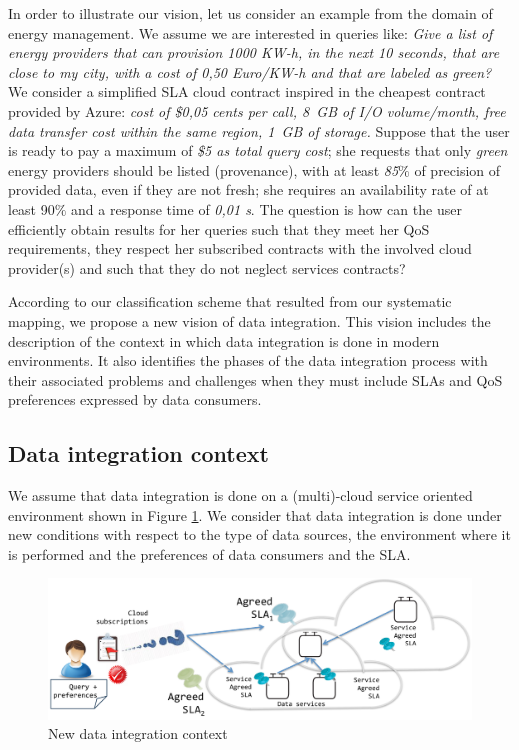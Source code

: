 
In order to illustrate our vision, let us consider an example from the domain of energy
management. We assume we are interested in queries like: \textit{Give a list
of energy providers that can provision 1000 KW-h, in the next 10 seconds, that are close to my city, with a cost of 0,50 Euro/KW-h and that are labeled as green?} We consider a simplified SLA cloud contract inspired in the cheapest contract provided by Azure: \textit{cost of \$0,05 cents per call,  8~GB of I/O volume/month, free data transfer cost within the same region,  1~GB of storage.} 
Suppose that the user is ready to pay a maximum of \textit{\$5 as total query cost}; she requests that only  \textit{green} energy providers should be  listed (provenance), with at least  \textit{85$\%$} of precision of provided data, even if they are not fresh; she requires an availability rate of at least 90$\%$ and a response time of  \textit{0,01 s}. 
  The question is how can the user efficiently obtain  results for her queries such that they meet her QoS requirements, they respect her subscribed contracts with the involved cloud provider(s) and such that they do not neglect services contracts? 

According to our classification scheme that resulted from our systematic mapping, we propose a new vision of data integration. This vision includes the description of the context in which data integration is done in modern environments. It also identifies the phases of the data integration process with their associated problems and challenges when they must include SLAs and QoS preferences expressed by data consumers. 


\subsection{Data integration context}
We assume that data integration is done on a (multi)-cloud service oriented environment shown in Figure \ref{fig:vision}.  We consider that data integration is done under new conditions with respect to the type of data sources, the environment where it is performed and the preferences  of data consumers and the SLA. 
\begin{figure}[h!]
\centering
\includegraphics[scale=0.50]{figs/DataIntegrationContext.pdf} 
\caption{New data integration context}\label{fig:vision}
\end{figure}

